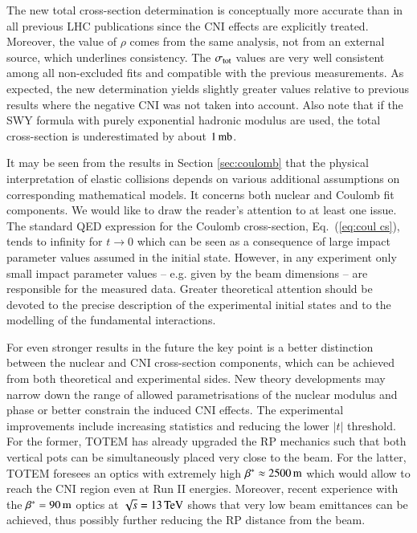 The new total cross-section determination is conceptually more accurate than in all previous LHC publications since the CNI effects are explicitly treated. Moreover, the value of $\rho$ comes from the same analysis, not from an external source, which underlines consistency. The $\sigma_{\rm tot}$ values are very well consistent among all non-excluded fits and compatible with the previous measurements. As expected, the new determination yields slightly greater values relative to previous results where the negative CNI was not taken into account. Also note that if the SWY formula with purely exponential hadronic modulus are used, the total cross-section is underestimated by about $1\,{\rm mb}$.

It may be seen from the results in Section \ref{sec:coulomb} that the physical interpretation of elastic collisions depends on various additional assumptions on corresponding mathematical models. It concerns both nuclear and Coulomb fit components. We would like to draw the reader's attention to at least one issue. The standard QED expression for the Coulomb cross-section, Eq.~(\ref{eq:coul cs}), tends to infinity for $t\to 0$ which can be seen as a consequence of large impact parameter values assumed in the initial state. However, in any experiment only small impact parameter values -- e.g. given by the beam dimensions -- are responsible for the measured data. Greater theoretical attention should be devoted to the precise description of the experimental initial states and to the modelling of the fundamental interactions.

For even stronger results in the future the key point is a better distinction between the nuclear and CNI cross-section components, which can be achieved from both theoretical and experimental sides. New theory developments may narrow down the range of allowed parametrisations of the nuclear modulus and phase or better constrain the induced CNI effects. The experimental improvements include increasing statistics and reducing the lower $|t|$ threshold. For the former, TOTEM has already upgraded the RP mechanics such that both vertical pots can be simultaneously placed very close to the beam. For the latter, TOTEM foresees an optics with extremely high $\beta^* \approx 2500\,{\rm m}$ which would allow to reach the CNI region even at Run II energies. Moreover, recent experience with the $\beta^* = 90\,{\rm m}$ optics at $\sqrt s = 13\,{\rm TeV}$ shows that very low beam emittances can be achieved, thus possibly further reducing the RP distance from the beam.
